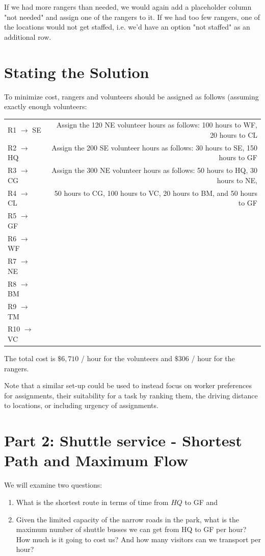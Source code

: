 If we had more rangers than needed, we would again add a placeholder column "not needed" and assign one of the rangers to it. If we had too few rangers, one of the locations would not get staffed, i.e. we'd have an option "not staffed" as an additional row.

\section*{Stating the Solution}
To minimize cost, rangers and volunteers should be assigned as follows (assuming exactly enough volunteers:

\begin{center}
\begin{tabular}{lr}
R1 $\rightarrow$ SE & Assign the 120 NE volunteer hours as follows: 100 hours to WF, 20 hours to CL \\
R2 $\rightarrow$ HQ & Assign the 200 SE volunteer hours as follows: 30 hours to SE, 150 hours to GF \\
R3 $\rightarrow$ CG & Assign the 300 NE volunteer hours as follows: 50 hours to HQ, 30 hours to NE, \\
R4 $\rightarrow$ CL & 50 hours to CG, 100 hours to VC, 20 hours to BM, and 50 hours to GF \\
R5 $\rightarrow$ GF &  \\
R6 $\rightarrow$ WF &  \\
R7 $\rightarrow$ NE &  \\
R8 $\rightarrow$ BM &  \\
R9 $\rightarrow$ TM &  \\
R10 $\rightarrow$ VC &  \\
\end{tabular}
\end{center}

The total cost is $\$ 6,710$ / hour for the volunteers and $\$ 306$ / hour for the rangers.

Note that a similar set-up could be used to instead focus on worker preferences for assignments, their suitability for a task by ranking them, the driving distance to locations, or including urgency of assignments.

\section*{Part 2: Shuttle service - Shortest Path and Maximum Flow}
We will examine two questions:

\begin{enumerate}
  \item What is the shortest route in terms of time from $H Q$ to GF and
  \item Given the limited capacity of the narrow roads in the park, what is the maximum number of shuttle busses we can get from HQ to GF per hour? How much is it going to cost us? And how many visitors can we transport per hour?
\end{enumerate}

